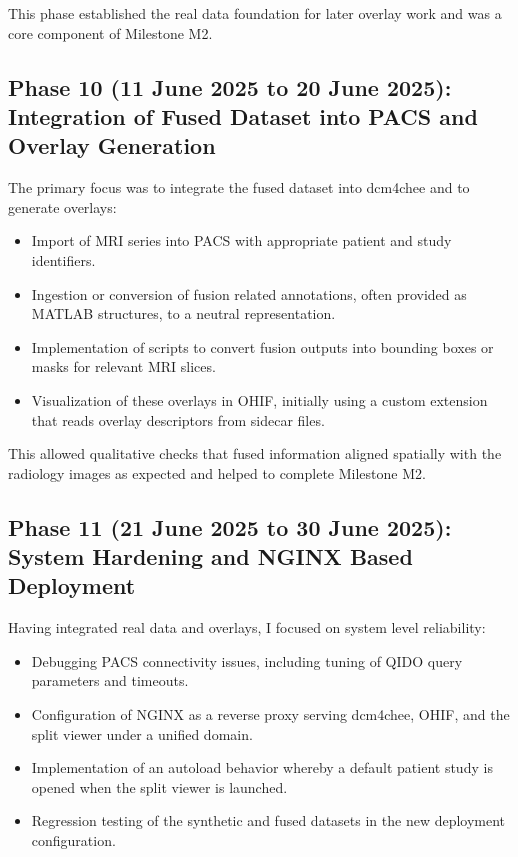 \documentclass[11pt,a4paper]{article}
\begin{document}
This phase established the real data foundation for later overlay work and was a core component of Milestone M2.

\subsection*{Phase 10 (11 June 2025 to 20 June 2025): Integration of Fused Dataset into PACS and Overlay Generation}

The primary focus was to integrate the fused dataset into dcm4chee and to generate overlays:

\begin{itemize}
    \item Import of MRI series into PACS with appropriate patient and study identifiers.
    \item Ingestion or conversion of fusion related annotations, often provided as MATLAB structures, to a neutral representation.
    \item Implementation of scripts to convert fusion outputs into bounding boxes or masks for relevant MRI slices.
    \item Visualization of these overlays in OHIF, initially using a custom extension that reads overlay descriptors from sidecar files.
\end{itemize}

This allowed qualitative checks that fused information aligned spatially with the radiology images as expected and helped to complete Milestone M2.

\subsection*{Phase 11 (21 June 2025 to 30 June 2025): System Hardening and NGINX Based Deployment}

Having integrated real data and overlays, I focused on system level reliability:

\begin{itemize}
    \item Debugging PACS connectivity issues, including tuning of QIDO query parameters and timeouts.
    \item Configuration of NGINX as a reverse proxy serving dcm4chee, OHIF, and the split viewer under a unified domain.
    \item Implementation of an autoload behavior whereby a default patient study is opened when the split viewer is launched.
    \item Regression testing of the synthetic and fused datasets in the new deployment configuration.
\end{itemize}
\end{document}
